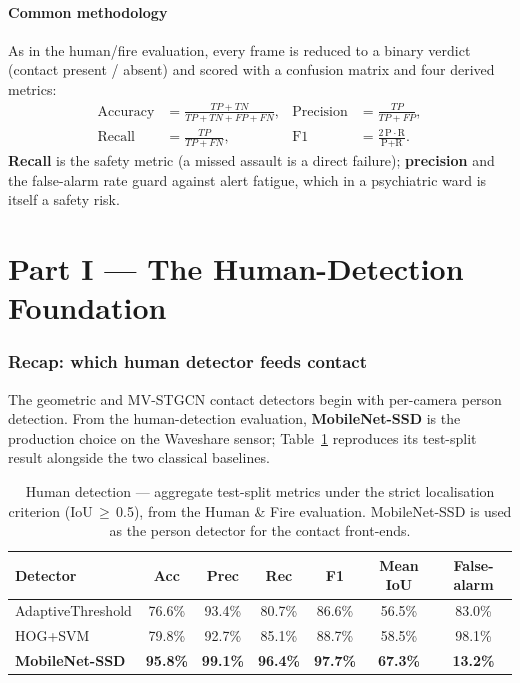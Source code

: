 \documentclass[11pt, a4paper]{article}
\begin{document}
\subsection{Common methodology}

As in the human/fire evaluation, every frame is reduced to a binary verdict
(contact present / absent) and scored with a confusion matrix and four derived
metrics:
\begin{align*}
\text{Accuracy} &= \tfrac{TP+TN}{TP+TN+FP+FN}, &
\text{Precision} &= \tfrac{TP}{TP+FP}, \\
\text{Recall} &= \tfrac{TP}{TP+FN}, &
\text{F1} &= \tfrac{2\,\text{P}\cdot\text{R}}{\text{P}+\text{R}}.
\end{align*}
\textbf{Recall} is the safety metric (a missed assault is a direct failure);
\textbf{precision} and the false-alarm rate guard against alert fatigue, which
in a psychiatric ward is itself a safety risk.

\part*{Part I — The Human-Detection Foundation}

\section{Recap: which human detector feeds contact}

The geometric and MV-STGCN contact detectors begin with per-camera person
detection. From the human-detection evaluation, \textbf{MobileNet-SSD} is the
production choice on the Waveshare sensor; Table~\ref{tab:human} reproduces its
test-split result alongside the two classical baselines.

\begin{table}[H]
\centering
\caption{Human detection --- aggregate test-split metrics under the strict
localisation criterion (IoU\,$\ge$\,0.5), from the Human \& Fire evaluation.
MobileNet-SSD is used as the person detector for the contact front-ends.}
\label{tab:human}
\renewcommand{\arraystretch}{1.3}
\begin{tabular}{lcccccc}
\toprule
\textbf{Detector} & \textbf{Acc} & \textbf{Prec} & \textbf{Rec} & \textbf{F1}
    & \textbf{Mean IoU} & \textbf{False-alarm} \\
\midrule
AdaptiveThreshold & 76.6\% & 93.4\% & 80.7\% & 86.6\% & 56.5\% & 83.0\% \\
HOG+SVM           & 79.8\% & 92.7\% & 85.1\% & 88.7\% & 58.5\% & 98.1\% \\
\textbf{MobileNet-SSD} & \textbf{95.8\%} & \textbf{99.1\%} & \textbf{96.4\%}
    & \textbf{97.7\%} & \textbf{67.3\%} & \textbf{13.2\%} \\
\bottomrule
\end{tabular}
\end{table}
\end{document}

